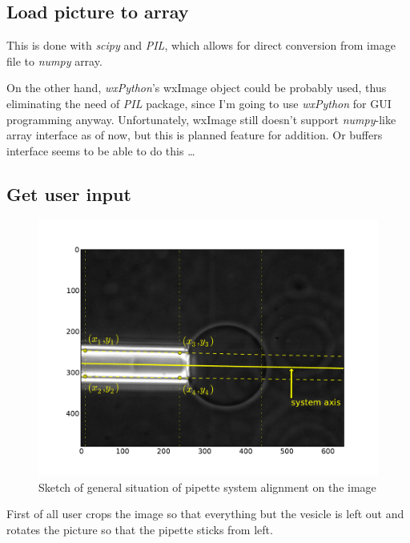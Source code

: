 \subsection{Load picture to array}\label{loadpic}

This is done with \emph{scipy} and \emph{PIL}, which allows for direct conversion from image file to \emph{numpy} array.

On the other hand, \emph{wxPython}'s wxImage object could be probably used, thus eliminating the need of \emph{PIL} package, since I'm going to use \emph{wxPython} for GUI programming anyway. Unfortunately, wxImage still doesn't support \emph{numpy}-like array interface as of now, but this is planned feature for addition. Or buffers interface seems to be able to do this \ldots

\subsection{Get user input}\label{getinput}

\begin{figure}
\includegraphics[width=\columnwidth]{figs/pipetteaxis.pdf}
\caption{Sketch of general situation of pipette system alignment on the image}
\label{fig:pipetteaxis}
\end{figure}

First of all user crops the image so that everything but the vesicle is left out and rotates the picture so that the pipette sticks from left.

